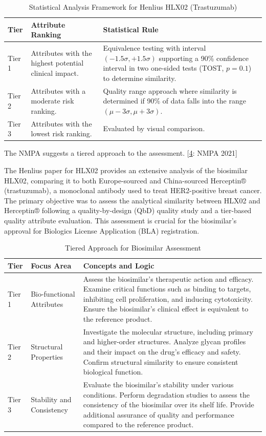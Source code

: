 \documentclass[
  12pt,
  a4paper,
]{article}
\numberwithin{equation}{section}
\theoremstyle{plain}
\theoremstyle{definition}
\theoremstyle{remark}
\theoremstyle{note}
\begin{document}
\begin{table}[h]
\centering
\caption{Statistical Analysis Framework for Henlius HLX02 (Trastuzumab)}
\begin{tabular}{|l|p{6cm}|p{6cm}|}
\hline
\textbf{Tier} & \textbf{Attribute Ranking} & \textbf{Statistical Rule} \\ \hline
Tier 1 & Attributes with the highest potential clinical impact. & Equivalence testing with interval \((-1.5\sigma, +1.5\sigma)\) supporting a 90\% confidence interval in two one-sided tests (TOST, \(p=0.1\)) to determine similarity. \\ \hline
Tier 2 & Attributes with a moderate risk ranking. & Quality range approach where similarity is determined if 90\% of data falls into the range \((\mu-3\sigma, \mu+3\sigma)\). \\ \hline
Tier 3 & Attributes with the lowest risk ranking. & Evaluated by visual comparison. \\ \hline
\end{tabular}
\end{table}

The NMPA suggests a tiered approach to the assessment.
{[}\protect\hyperlink{ref-noauthor_center_2021}{4}: NMPA 2021{]}

The Henlius paper for HLX02 provides an extensive analysis of the
biosimilar HLX02, comparing it to both Europe-sourced and China-sourced
Herceptin® (trastuzumab), a monoclonal antibody used to treat
HER2-positive breast cancer. The primary objective was to assess the
analytical similarity between HLX02 and Herceptin® following a
quality-by-design (QbD) quality study and a tier-based quality attribute
evaluation. This assessment is crucial for the biosimilar's approval for
Biologics License Application (BLA) registration.

\begin{table}[h]
\centering
\caption{Tiered Approach for Biosimilar Assessment}
\begin{tabular}{|l|l|p{10cm}|}
\hline
\textbf{Tier} & \textbf{Focus Area}            & \textbf{Concepts and Logic} \\ \hline
Tier 1        & Bio-functional Attributes     & Assess the biosimilar's therapeutic action and efficacy. Examine critical functions such as binding to targets, inhibiting cell proliferation, and inducing cytotoxicity. Ensure the biosimilar's clinical effect is equivalent to the reference product. \\ \hline
Tier 2        & Structural Properties          & Investigate the molecular structure, including primary and higher-order structures. Analyze glycan profiles and their impact on the drug's efficacy and safety. Confirm structural similarity to ensure consistent biological function. \\ \hline
Tier 3        & Stability and Consistency      & Evaluate the biosimilar's stability under various conditions. Perform degradation studies to assess the consistency of the biosimilar over its shelf life. Provide additional assurance of quality and performance compared to the reference product. \\ \hline
\end{tabular}
\end{table}
\end{document}
